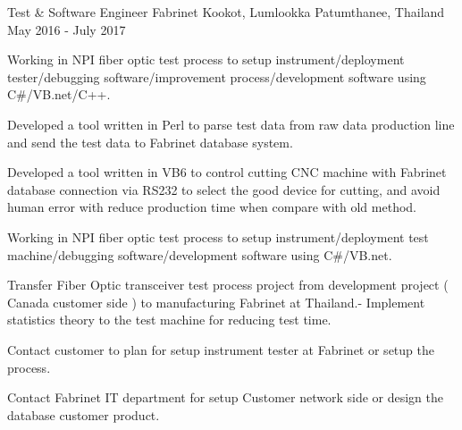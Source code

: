 \begin{cventries}
  \cventry
    {Test \& Software Engineer} %
    {Fabrinet} %
    {Kookot, Lumlookka Patumthanee, Thailand} %
    {May 2016 - July 2017} %
    {
      \begin{cvitems} %
         \item {Working in NPI fiber optic test process to setup
           instrument/deployment tester/debugging software/improvement
           process/development software using C\#/VB.net/C++.}
         \item {Developed a tool written in Perl to parse test data from raw data production line and send the test
         data to Fabrinet database system.}
         \item {Developed a tool written in VB6 to control cutting CNC machine with Fabrinet database connection via
         RS232 to select the good device for cutting, and avoid human error with reduce production time
                 when compare with old method.}
         \item {Working in NPI fiber optic test process to setup instrument/deployment test machine/debugging
         software/development software using C\#/VB.net.}
         \item {Transfer Fiber Optic transceiver test process project from development project ( Canada customer
                side ) to manufacturing Fabrinet at Thailand.- Implement statistics theory to
                 the test machine for reducing test time.}
         \item {Contact customer to plan for setup instrument tester at Fabrinet or
                setup the process.}
         \item {Contact Fabrinet IT department for setup Customer network side or
                design the database customer product.}
      \end{cvitems}
    }


\end{cventries}
